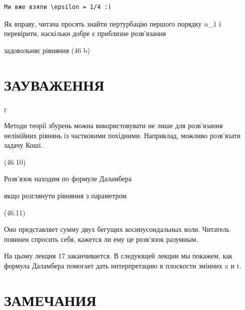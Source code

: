 \documentclass[
  ukrainian,
]{article}
\begin{document}
\begin{verbatim}
Ми вже взяли \epsilon = 1/4 :)
\end{verbatim}

Як вправу, читача просять знайти пертурбацію першого порядку u\_1 і
перевірити, наскільки добре є приблизне розв'язання

задовольняє рівняння (46 b)

\section{ЗАУВАЖЕННЯ}\label{ux437ux430ux443ux432ux430ux436ux435ux43dux43dux44f-6}

ŗ

Методи теорії збурень можна використовувати не лише для розв'язання
нелінійних рівнянь із частковими похідними. Наприклад, можливо
розв'язати задачу Коші.

(46 10)

Розв'язок находим по формуле Даламбера

якщо розглянути рівняння з параметром

(46.11)

Оно представляет сумму двух бегущих косинусоидальных воли. Читатель
повинен спросить себя, кажется ли ему це розв'язок разумным.

На цьому лекция 17 заканчивается. В следующей лекции мы покажем, как
формула Даламбера помогает дать интерпретацию в плоскости змінних x и t.

\section{ЗАМЕЧАНИЯ}\label{ux437ux430ux43cux435ux447ux430ux43dux438ux44f-2}
\end{document}
